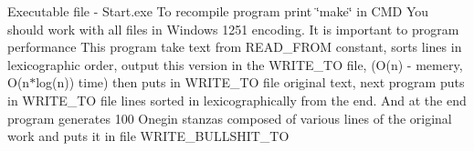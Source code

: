  Executable file -\/ Start.\+exe To recompile program print \char`\"{}make\char`\"{} in CMD 
 You should work with all files in Windows 1251 encoding. It is important to program performance 
 This program take text from READ\+\_\+\+FROM constant, sorts lines in lexicographic order, output this version in the WRITE\+\_\+\+TO file, (O(n) -\/ memery, O(n$\ast$log(n)) time) then puts in WRITE\+\_\+\+TO file original text, next program puts in WRITE\+\_\+\+TO file lines sorted in lexicographically from the end. And at the end program generates 100 Onegin stanzas composed of various lines of the original work and puts it in file WRITE\+\_\+\+BULLSHIT\+\_\+\+TO 